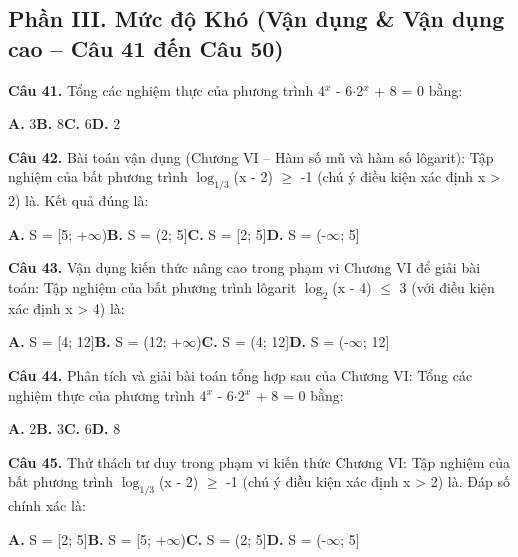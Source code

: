 \documentclass[11pt,a4paper]{article}
\begin{document}
\subsection*{\color{accent} Phần III. Mức độ Khó (Vận dụng \& Vận dụng cao -- Câu 41 đến Câu 50)}
\textbf{\color{primary} Câu 41.} Tổng các nghiệm thực của phương trình 4$^{x}$ - 6$\cdot$2$^{x}$ + 8 = 0 bằng:\par
\hspace*{1.5em}\textbf{A.} 3\quad\quad \textbf{B.} 8\quad\quad \textbf{C.} 6\quad\quad \textbf{D.} 2\par\vspace{2pt}
\textbf{\color{primary} Câu 42.} Bài toán vận dụng (Chương VI – Hàm số mũ và hàm số lôgarit): Tập nghiệm của bất phương trình $\log_{1/3}$(x - 2) $\ge$ -1 (chú ý điều kiện xác định x > 2) là. Kết quả đúng là:\par
\hspace*{1.5em}\textbf{A.} S = [5; +$\infty$)\quad\quad \textbf{B.} S = (2; 5]\quad\quad \textbf{C.} S = [2; 5]\quad\quad \textbf{D.} S = (-$\infty$; 5]\par\vspace{2pt}
\textbf{\color{primary} Câu 43.} Vận dụng kiến thức nâng cao trong phạm vi Chương VI để giải bài toán: Tập nghiệm của bất phương trình lôgarit $\log_2$(x - 4) $\le$ 3 (với điều kiện xác định x > 4) là:\par
\hspace*{1.5em}\textbf{A.} S = [4; 12]\quad\quad \textbf{B.} S = (12; +$\infty$)\quad\quad \textbf{C.} S = (4; 12]\quad\quad \textbf{D.} S = (-$\infty$; 12]\par\vspace{2pt}
\textbf{\color{primary} Câu 44.} Phân tích và giải bài toán tổng hợp sau của Chương VI: Tổng các nghiệm thực của phương trình 4$^{x}$ - 6$\cdot$2$^{x}$ + 8 = 0 bằng:\par
\hspace*{1.5em}\textbf{A.} 2\quad\quad \textbf{B.} 3\quad\quad \textbf{C.} 6\quad\quad \textbf{D.} 8\par\vspace{2pt}
\textbf{\color{primary} Câu 45.} Thử thách tư duy trong phạm vi kiến thức Chương VI: Tập nghiệm của bất phương trình $\log_{1/3}$(x - 2) $\ge$ -1 (chú ý điều kiện xác định x > 2) là. Đáp số chính xác là:\par
\hspace*{1.5em}\textbf{A.} S = [2; 5]\quad\quad \textbf{B.} S = [5; +$\infty$)\quad\quad \textbf{C.} S = (2; 5]\quad\quad \textbf{D.} S = (-$\infty$; 5]\par\vspace{2pt}
\end{document}

